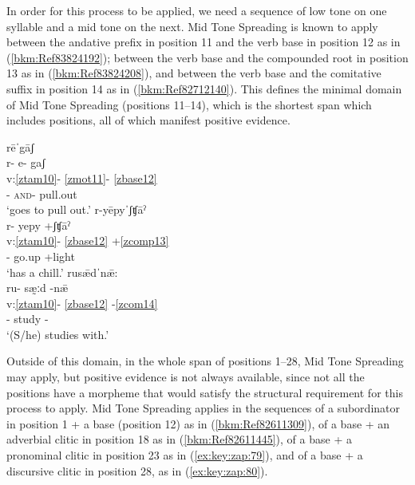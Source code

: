 \documentclass[output=paper]{langscibook}
\begin{document}
In order for this process to be applied, we need a sequence of low tone on one syllable and a mid tone on the next. Mid Tone Spreading is known to apply between the andative prefix in position 11 and the verb base in position 12 as in (\ref{bkm:Ref83824192}); between the verb base and the compounded root in position 13 as in (\ref{bkm:Ref83824208}), and between the verb base and the comitative suffix in position 14 as in (\ref{bkm:Ref82712140}). This defines the minimal domain of Mid Tone Spreading (positions 11--14), which is the shortest span which includes positions, all of which manifest positive evidence. 

\ea\label{bkm:Ref83824192}
{rēˈgāʃ}\\
\glll r- e- gaʃ\\
v:\ref{ztam10}- \ref{zmot11}- \ref{zbase12} \\
 \Hab{}- \textsc{and}- pull.out \\
\glt `goes to pull out.'
\ex\label{bkm:Ref83824208}
{r-yēpyˈʃʧāˀ}\\
\glll r- yepy +ʃʧāˀ\\
v:\ref{ztam10}- \ref{zbase12} +\ref{zcomp13} \\
 \Hab{}- go.up +light\\
\glt `has a chill.'
\ex\label{bkm:Ref82712140}
{rusǣdˈnǣ:}\\
\glll ru- sæ̰ːd -nǣ\\
v:\ref{ztam10}- \ref{zbase12} {}-\ref{zcom14} \\ 
\Hab{}- study -\Com{}\\
\glt `(S/he) studies with.'
\z

Outside of this domain, in the whole span of positions 1--28, Mid Tone Spreading may apply, but positive evidence is not always available, since not all the positions have a morpheme that would satisfy the structural requirement for this process to apply. Mid Tone Spreading applies in the sequences of a subordinator in position 1 + a base (position 12) as in (\ref{bkm:Ref82611309}), of a base + an adverbial clitic in position 18 as in (\ref{bkm:Ref82611445}), of a base + a pronominal clitic in position 23 as in (\ref{ex:key:zap:79}), and of a base + a discursive clitic in position 28, as in (\ref{ex:key:zap:80}).
\end{document}

